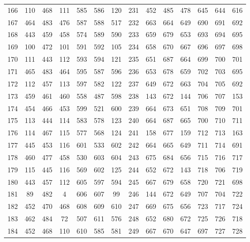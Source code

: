 \begin{apendicesenv}
\begin{table}[H]
\begin{tabular}{@{}ccccccc@{\hspace{1.0cm}}ccccccc@{}}
		166 &  110 &  468 &  111 &  585 &  586 &  120 & 231 &  452 &  485 &  478 &  645 &  644 &  616 \\
		167 &  464 &  483 &  476 &  587 &  588 &  517 & 232 &  663 &  664 &  649 &  690 &  691 &  692 \\
		168 &  443 &  459 &  458 &  574 &  589 &  590 & 233 &  659 &  679 &  653 &  693 &  694 &  695 \\
		169 &  100 &  472 &  101 &  591 &  592 &  105 & 234 &  658 &  670 &  667 &  696 &  697 &  698 \\
		170 &  111 &  443 &  112 &  593 &  594 &  121 & 235 &  651 &  687 &  664 &  699 &  700 &  701 \\
		171 &  465 &  483 &  464 &  595 &  587 &  596 & 236 &  653 &  678 &  659 &  702 &  703 &  695 \\
		172 &  112 &  457 &  113 &  597 &  582 &  122 & 237 &  649 &  672 &  663 &  704 &  705 &  692 \\
		173 &  459 &  461 &  460 &  558 &  487 &  598 & 238 &  143 &  672 &  144 &  706 &  707 &  153 \\
		174 &  454 &  466 &  453 &  599 &  521 &  600 & 239 &  664 &  673 &  651 &  708 &  709 &  701 \\
		175 &  113 &  444 &  114 &  583 &  578 &  123 & 240 &  664 &  687 &  665 &  700 &  710 &  711 \\
		176 &  114 &  467 &  115 &  577 &  568 &  124 & 241 &  158 &  677 &  159 &  712 &  713 &  163 \\
		177 &  445 &  453 &  116 &  601 &  533 &  602 & 242 &  664 &  665 &  649 &  711 &  714 &  691 \\
		178 &  460 &  477 &  458 &  530 &  603 &  604 & 243 &  675 &  684 &  656 &  715 &  716 &  717 \\
		179 &  115 &  445 &  116 &  569 &  602 &  125 & 244 &  652 &  672 &  143 &  718 &  706 &  719 \\
		180 &  443 &  457 &  112 &  605 &  597 &  594 & 245 &  667 &  679 &  658 &  720 &  721 &  698 \\
		181 &   89 &  482 &    4 &  606 &  607 &   99 & 246 &  144 &  672 &  649 &  707 &  704 &  722 \\
		182 &  452 &  470 &  468 &  608 &  609 &  610 & 247 &  669 &  675 &  656 &  723 &  717 &  724 \\
		183 &  462 &  484 &   72 &  507 &  611 &  576 & 248 &  652 &  680 &  672 &  725 &  726 &  718 \\
		184 &  452 &  468 &  110 &  610 &  585 &  581 & 249 &  667 &  670 &  647 &  697 &  727 &  728 \\

\end{tabular}
\end{table}
\end{apendicesenv}
